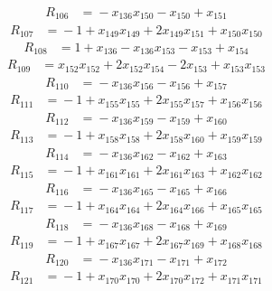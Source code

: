 \begin{align*}
R_{106}&={}-x_{136}x_{150} -x_{150} +x_{151}
\end{align*}
\begin{align*}
R_{107}&={}-1 +x_{149}x_{149} +2x_{149}x_{151} +x_{150}x_{150}
\end{align*}
\begin{align*}
R_{108}&={}1 +x_{136} -x_{136}x_{153} -x_{153} +x_{154}
\end{align*}
\begin{align*}
R_{109}&={}x_{152}x_{152} +2x_{152}x_{154} -2x_{153} +x_{153}x_{153}
\end{align*}
\begin{align*}
R_{110}&={}-x_{136}x_{156} -x_{156} +x_{157}
\end{align*}
\begin{align*}
R_{111}&={}-1 +x_{155}x_{155} +2x_{155}x_{157} +x_{156}x_{156}
\end{align*}
\begin{align*}
R_{112}&={}-x_{136}x_{159} -x_{159} +x_{160}
\end{align*}
\begin{align*}
R_{113}&={}-1 +x_{158}x_{158} +2x_{158}x_{160} +x_{159}x_{159}
\end{align*}
\begin{align*}
R_{114}&={}-x_{136}x_{162} -x_{162} +x_{163}
\end{align*}
\begin{align*}
R_{115}&={}-1 +x_{161}x_{161} +2x_{161}x_{163} +x_{162}x_{162}
\end{align*}
\begin{align*}
R_{116}&={}-x_{136}x_{165} -x_{165} +x_{166}
\end{align*}
\begin{align*}
R_{117}&={}-1 +x_{164}x_{164} +2x_{164}x_{166} +x_{165}x_{165}
\end{align*}
\begin{align*}
R_{118}&={}-x_{136}x_{168} -x_{168} +x_{169}
\end{align*}
\begin{align*}
R_{119}&={}-1 +x_{167}x_{167} +2x_{167}x_{169} +x_{168}x_{168}
\end{align*}
\begin{align*}
R_{120}&={}-x_{136}x_{171} -x_{171} +x_{172}
\end{align*}
\begin{align*}
R_{121}&={}-1 +x_{170}x_{170} +2x_{170}x_{172} +x_{171}x_{171}
\end{align*}
